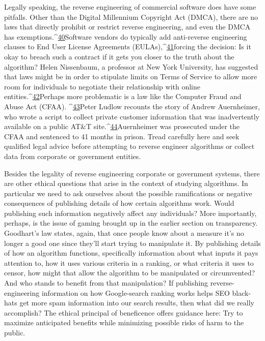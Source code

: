 Legally speaking, the reverse engineering of commercial software does have some pitfalls. Other than the Digital Millennium Copyright Act (DMCA), there are no laws that directly prohibit or restrict reverse engineering, and even the DMCA has exemptions.^{\href{#endnotes}{40}}Software vendors do typically add anti-reverse engineering clauses to End User License Agreements (EULAs),^{\href{#endnotes}{41}}forcing the decision: Is it okay to breach such a contract if it gets you closer to the truth about the algorithm? Helen Nissenbaum, a professor at New York University, has suggested that laws might be in order to stipulate limits on Terms of Service to allow more room for individuals to negotiate their relationship with online entities.^{\href{#endnotes}{42}}Perhaps more problematic is a law like the Computer Fraud and Abuse Act (CFAA). ^{\href{#endnotes}{43}}Peter Ludlow recounts the story of Andrew Auernheimer, who wrote a script to collect private customer information that was inadvertently available on a public AT&T site.^{\href{#endnotes}{44}}Auernheimer was prosecuted under the CFAA and sentenced to 41 months in prison. Tread carefully here and seek qualified legal advice before attempting to reverse engineer algorithms or collect data from corporate or government entities. 

Besides the legality of reverse engineering corporate or government systems, there are other ethical questions that arise in the context of studying algorithms. In particular we need to ask ourselves about the possible ramifications or negative consequences of publishing details of how certain algorithms work. Would publishing such information negatively affect any individuals? More importantly, perhaps, is the issue of gaming brought up in the earlier section on transparency. Goodhart's law states, again, that once people know about a measure it's no longer a good one since they'll start trying to manipulate it. By publishing details of how an algorithm functions, specifically information about what inputs it pays attention to, how it uses various criteria in a ranking, or what criteria it uses to censor, how might that allow the algorithm to be manipulated or circumvented? And who stands to benefit from that manipulation? If publishing reverse-engineering information on how Google-search ranking works helps SEO black-hats get more spam information into our search results, then what did we really accomplish? The ethical principal of beneficence offers guidance here: Try to maximize anticipated benefits while minimizing possible risks of harm to the public. 

